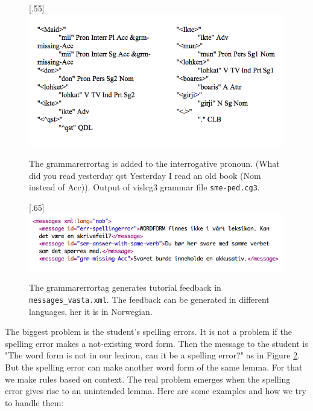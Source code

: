 \documentclass[a4paper,12pt]{article}
\begin{document}
\begin{figure}[htbp]
\begin{center}
\scalebox{.55}[.55]{\includegraphics{presentation/img/maid_lohket_ikte2.png}}
\caption{The grammarerrortag is added to the interrogative pronoun. (What did you read yesterday qst Yesterday I read an old book (Nom instead of Acc)). Output of vislcg3 grammar file \texttt{sme-ped.cg3}.}
\label{maidlohket}
\end{center}
\end{figure}



\begin{figure}[htbp]
\begin{center}
\scalebox{.65}[.65]{\includegraphics{presentation/img/messages_vasta.png}}
\caption{The grammarerrortag generates tutorial feedback in \texttt{messages\_vasta.xml}. The feedback can be generated in different languages, her it is in Norwegian.}
\label{messv}
\end{center}
\end{figure}

The biggest problem is the student's spelling errors. It is not a problem if the spelling error makes a not-existing word form. Then the message to the student is  "The word form is not in our lexicon, can it be a spelling error?" as in Figure \ref{messv}. But the spelling error can make another word form of the same lemma. For that we make rules based on context. The real problem emerges when the spelling error gives rise to an unintended lemma. Here are some examples and how we try to handle them:\\
\end{document}
